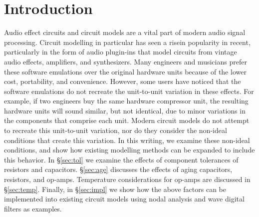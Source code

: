 \documentclass[twoside,a4paper]{article}
\title{\papertitle}
\affiliation{
\paperauthorA \,}
{\href{http://ccrma.stanford.edu}{Center for Computer Research in Music and Acoustics} \\ Stanford University \\ Palo Alto, CA \\ {\tt \href{mailto:jatin@ccrma.stanford.edu}{jatin@ccrma.stanford.edu}}}
\newif\ifpdf
\begin{document}
\ifpdf %
  \DeclareGraphicsExtensions{.png,.jpg,.pdf}
\else  %
\fi

\maketitle
%
\begin{abstract}
Traditional circuit modelling methods typically assume ideal
circuit components. Real world audio circuits exhibit
variations in behavior due to non-ideal factors including
component tolerances, operating temperature, and aging.
We present an brief discussion of each of these non-ideal
factors for resistors, capacitors, and operational amplifiers
(op-amps), and show how they each individually affect the
behavior of a circuit model. We present a model of a Sallen-Key
lowpass filter circuit that incorporates all of the non-ideal factors
together.
\end{abstract}

\section{Introduction} \label{sec:intro}
%
Audio effect circuits and circuit models are a vital part
of modern audio signal processing. Circuit modelling in
particular has seen a risein popularity in recent,
particularly in the form of audio plugin-ins that model
circuits from vintage audio effects, amplifiers, and synthesizers.
Many engineers and musicians prefer these software emulations over
the original hardware units because of the lower cost, portability,
and convenience. However, some users have noticed that the software
emulations do not recreate the unit-to-unit variation in these effects.
For example, if two engineers buy the same hardware compressor unit,
the resulting hardware units will sound similar, but not identical,
due to minor variations in the components that comprise each unit.
Modern circuit models do not attempt to recreate this unit-to-unit
variation, nor do they consider the non-ideal conditions that create
this variation.
\newline\newline
In this writing, we examine these non-ideal conditions, and show how
existing modelling methods can be expanded to include this behavior.
In \S\ref{sec:tol} we examine the effects of component tolerances of resistors
and capacitors. \S\ref{sec:age} discusses the effects of aging capacitors,
resistors, and op-amps. Temperature considerations for
op-amps are discussed in \S\ref{sec:temp}. Finally, in \S\ref{sec:impl} we
show how the above factors can be implemented into existing circuit models
using nodal analysis and wave digital filters as examples.
\end{document}
